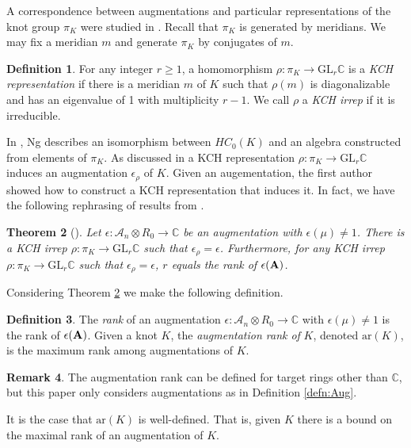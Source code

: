 \documentclass{amsart}[11pt,fullpage]
\def\C{{\mathbb C}}
\def\A{{\mathcal A}}
\newtheorem{thm}{Theorem}[section]
\theoremstyle{definition}
\newtheorem{defn}[thm]{Definition}
\newtheorem{rem}[thm]{Remark}
\begin{document}
  A correspondence between augmentations and particular representations of the knot group $\pi_K$ were studied in \cite{Cor13a}. Recall that $\pi_K$ is generated by meridians. We may fix a meridian $m$ and generate $\pi_K$ by conjugates of $m$.

  \begin{defn}
  For any integer $r\ge1$, a homomorphism $\rho:\pi_K\to\text{GL}_r\C$ is a \emph{KCH representation} if there is a meridian $m$ of $K$ such that $\rho(m)$ is diagonalizable and has an eigenvalue of 1 with multiplicity $r-1$. We call $\rho$ a \emph{KCH irrep} if it is irreducible.
  \label{defn:KCHReps}
  \end{defn}

  In \cite{Ng08}, Ng describes an isomorphism between $HC_0(K)$ and an algebra constructed from elements of $\pi_K$. As discussed in \cite{Ng12} a KCH representation $\rho:\pi_K\to\text{GL}_r\C$ induces an augmentation $\epsilon_\rho$ of $K$. Given an augementation, the first author showed how to construct a KCH representation that induces it. In fact, we have the following rephrasing of results from \cite{Cor13a}.

  \begin{thm}[\cite{Cor13a}]
  Let $\epsilon:\A_n\otimes R_0\to\C$ be an augmentation with $\epsilon(\mu)\ne 1$. There is a KCH irrep $\rho:\pi_K\to\text{GL}_r\C$ such that $\epsilon_\rho=\epsilon$. Furthermore, for any KCH irrep $\rho:\pi_K\to\text{GL}_r\C$ such that $\epsilon_\rho = \epsilon$, $r$ equals the rank of $\epsilon({\bf A})$.
  \label{thm:AugKCH_Corresp}
  \end{thm}

  Considering Theorem \ref{thm:AugKCH_Corresp} we make the following definition.

  \begin{defn}
  The \emph{rank} of an augmentation $\epsilon:\A_n\otimes R_0\to\C$ with $\epsilon(\mu)\ne 1$ is the rank of $\epsilon({\bf A})$. Given a knot $K$, the \emph{augmentation rank of} $K$, denoted $\text{ar}(K)$, is the maximum rank among augmentations of $K$.
  \label{defn:AugRk}
  \end{defn}

  \begin{rem} The augmentation rank can be defined for target rings other than $\C$, but this paper only considers augmentations as in Definition \ref{defn:Aug}.
  \end{rem}

  It is the case that $\text{ar}(K)$ is well-defined. That is, given $K$ there is a bound on the maximal rank of an augmentation of $K$.
\end{document}
